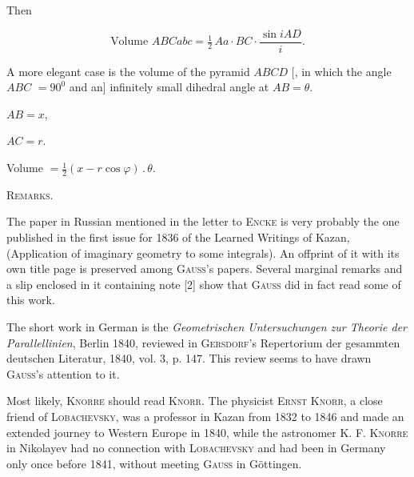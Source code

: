 %
\par
Then

\[
\text{Volume } ABCabc = \tfrac{1}{2}\, Aa \cdot BC \cdot \frac{\sin iAD}{i}.
\]


A more elegant case is the volume of the pyramid $ABCD$ [, in which the angle $ABC$
$= 90^0$ and an] infinitely small dihedral angle at $AB = \theta$.

\begin{center}
\begin{minipage}[b]{6.1cm}\begin{center}
$AB = x,$

$AC = r.$

Volume $= \tfrac{1}{2}(x - r\cos\varphi)\,.\,\theta.$
\end{center}\end{minipage}\hfill
\begin{minipage}[b]{6.5cm}\end{minipage}
\end{center}

\begin{center}


\textsc{Remarks.}
\end{center}


\begingroup\small
The paper in Russian mentioned in the letter to \textsc{Encke} is
very probably the one published in the first issue for 1836 of the Learned Writings of Kazan,
 (Application of imaginary geometry to some integrals). An offprint of it
with its own title page is preserved among \textsc{Gauss}'s papers.
Several marginal remarks and a slip enclosed in it containing note
[2] show that \textsc{Gauss} did in fact read some of this work.


The short work in German is the \emph{Geometrischen Untersuchungen
zur Theorie der Parallellinien}, Berlin 1840, reviewed in \textsc{Gersdorf}'s Repertorium
der gesammten deutschen Literatur, 1840, vol. 3, p. 147.
This review seems to have drawn \textsc{Gauss}'s attention to it.


Most likely, \textsc{Knorre} should read \textsc{Knorr}. The physicist \textsc{Ernst Knorr},
a close friend of \textsc{Lobachevsky}, was a professor in Kazan from 1832
to 1846 and made an extended journey to Western Europe in 1840,
while the astronomer \textsc{K. F. Knorre} in Nikolayev had no connection with
\textsc{Lobachevsky} and had been in Germany only once before 1841, without meeting \textsc{Gauss} in
Göttingen.


